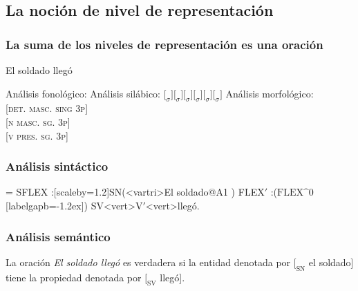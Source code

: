 \documentclass[compress]{beamer}
\begin{document}
\subsection{La noción de nivel de representación}
	\begin{frame}
	\frametitle{La suma de los niveles de representación es una oración}
	El soldado llegó
	\begin{exe}
	  \ex Análisis fonológico: 
	  \ex Análisis silábico: $[_\sigma$$]$$[_\sigma$$]$$[_\sigma$$]$$[_\sigma$$]$$[_\sigma$$]$$[_\sigma$$]$
	    \ex Análisis morfológico:\\ [\textsc{det. masc. sing
	    3p}]\\
	    [\textsc{n masc. sg. 3p}]\\
	    [\textsc{v pres. sg. 3p}]

	\end{exe}
	\end{frame}


	\begin{frame}[fragile]
	\frametitle{Análisis sintáctico}
	\begin{center}
	\jtree[xunit=3.6em,yunit=2em]
	\def\\{[labelgapb=-1.2ex]}%
	\! = {SFLEX}
	   :[scaleby=1.2]{SN}(<vartri>{El soldado}@A1 ) {FLEX$'$}
	   :({$\textrm {FLEX^0}$}\\{})
	   {SV}<vert>{V$'$}<vert>{llegó}.
	\ncbar[angleA=-90,angleB=-90,armA=1em,armB=1em,linearc=.6ex]{->}{A2}{A1}
	\endjtree

	\end{center}

	\end{frame}


	\begin{frame}

	\frametitle{Análisis semántico}
	\begin{center}
	La oración \emph{El soldado llegó} es verdadera si la entidad
	denotada por $[_{\textrm {SN}}$ el soldado] tiene la propiedad denotada
	por $[_{\textrm {SV}}$ llegó].
	\end{center}
	\end{frame}
\end{document}
